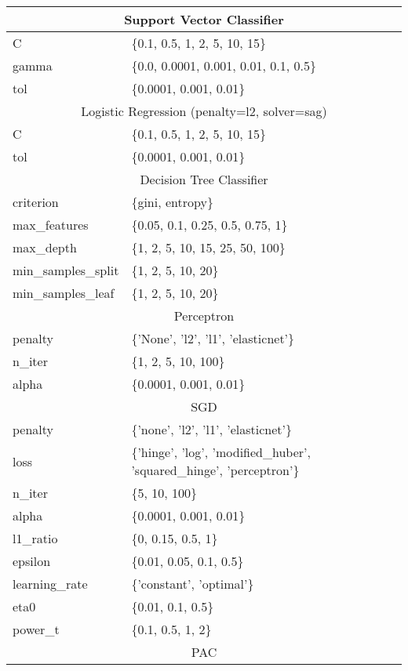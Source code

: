 \documentclass{ws-ijait}
\begin{document}
\begin{table}[p]
{\begin{tabular}{ll}
\hline
\multicolumn{2}{c}{Support Vector Classifier} \\
\hline
C & \{0.1, 0.5, 1, 2, 5, 10, 15\} \\
gamma & \{0.0, 0.0001, 0.001, 0.01, 0.1, 0.5\} \\
tol & \{0.0001, 0.001, 0.01\} \\
\hline
\multicolumn{2}{c}{Logistic Regression (penalty=l2, solver=sag)} \\
\hline
C & \{0.1, 0.5, 1, 2, 5, 10, 15\} \\
tol & \{0.0001, 0.001, 0.01\} \\
\hline
\multicolumn{2}{c}{Decision Tree Classifier} \\
\hline
criterion & \{gini, entropy\} \\
max\_features & \{0.05, 0.1, 0.25, 0.5, 0.75, 1\} \\
max\_depth & \{1, 2, 5, 10, 15, 25, 50, 100\} \\
min\_samples\_split & \{1, 2, 5, 10, 20\} \\
min\_samples\_leaf & \{1, 2, 5, 10, 20\} \\
\hline
\multicolumn{2}{c}{Perceptron} \\
\hline
penalty & \{'None', 'l2', 'l1', 'elasticnet'\} \\
n\_iter  & \{1, 2, 5, 10, 100\} \\
alpha & \{0.0001, 0.001, 0.01\} \\
\hline
\multicolumn{2}{c}{SGD} \\
\hline
penalty & \{'none', 'l2', 'l1', 'elasticnet'\} \\
loss & \{'hinge', 'log', 'modified\_huber', 'squared\_hinge', 'perceptron'\} \\
n\_iter & \{5, 10, 100\} \\
alpha & \{0.0001, 0.001, 0.01\} \\
l1\_ratio & \{0, 0.15, 0.5, 1\} \\
epsilon & \{0.01, 0.05, 0.1, 0.5\} \\
learning\_rate & \{'constant', 'optimal'\} \\
eta0 & \{0.01, 0.1, 0.5\} \\
power\_t & \{0.1, 0.5, 1, 2\} \\
\hline
\multicolumn{2}{c}{PAC} \\

\end{tabular}}
\end{table}
\end{document}
